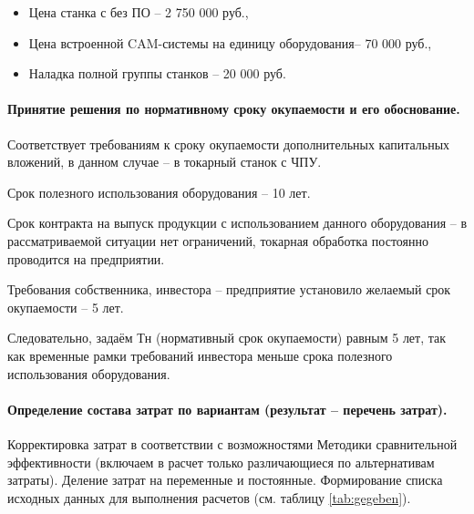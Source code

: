 \begin{itemize}
	\item Цена станка с без ПО – 2 750 000 руб.,
	\item Цена встроенной CAM-системы на единицу оборудования– 70 000 руб.,
	\item Наладка полной группы станков – 20 000 руб.
\end{itemize}

\paragraph{Принятие решения по нормативному сроку окупаемости и его обоснование.} Соответствует требованиям к сроку окупаемости дополнительных капитальных вложений, в данном случае – в токарный станок с ЧПУ.

Срок полезного использования оборудования – 10 лет.

Срок контракта на выпуск продукции с использованием данного оборудования – в рассматриваемой ситуации нет ограничений, токарная обработка постоянно проводится на предприятии.

Требования собственника, инвестора – предприятие установило желаемый срок окупаемости – 5 лет.

Следовательно, задаём Тн (нормативный срок окупаемости) равным 5 лет, так как временные рамки требований инвестора меньше срока полезного использования оборудования.

\paragraph{Определение состава затрат по вариантам (результат – перечень затрат).} Корректировка затрат в соответствии с возможностями Методики сравнительной эффективности (включаем в расчет только различающиеся по альтернативам затраты). Деление затрат на переменные и постоянные. Формирование списка исходных данных для выполнения расчетов (см. таблицу \ref{tab:gegeben}).

